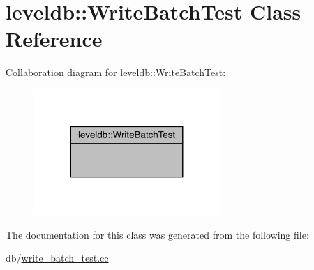 \hypertarget{classleveldb_1_1_write_batch_test}{}\section{leveldb\+::Write\+Batch\+Test Class Reference}
\label{classleveldb_1_1_write_batch_test}


Collaboration diagram for leveldb\+::Write\+Batch\+Test\+:
\nopagebreak
\begin{figure}[H]
\begin{center}
\leavevmode
\includegraphics[width=200pt]{classleveldb_1_1_write_batch_test__coll__graph}
\end{center}
\end{figure}


The documentation for this class was generated from the following file\+:\begin{DoxyCompactItemize}
\item 
db/\mbox{\hyperlink{write__batch__test_8cc}{write\+\_\+batch\+\_\+test.\+cc}}\end{DoxyCompactItemize}
